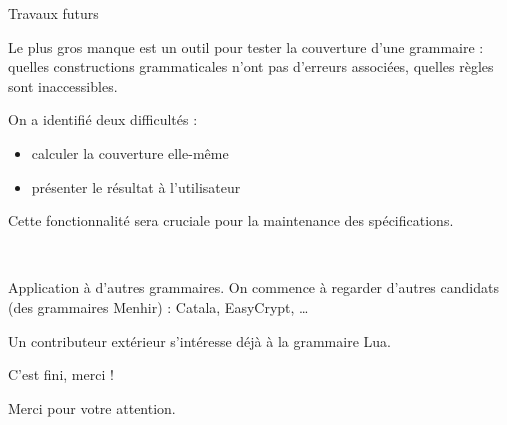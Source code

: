 \documentclass{beamer}          %
\begin{document}
\begin{frame}{Travaux futurs}

Le plus gros manque est un outil pour tester la couverture d'une grammaire : quelles constructions grammaticales n'ont pas d'erreurs associées, quelles règles sont inaccessibles.

On a identifié deux difficultés :
\begin{itemize}
  \item calculer la couverture elle-même
  \item présenter le résultat à l'utilisateur
\end{itemize}

Cette fonctionnalité sera cruciale pour la maintenance des spécifications.

\

\pause
Application à d'autres grammaires. On commence à regarder d'autres candidats (des grammaires Menhir) : Catala, EasyCrypt, \ldots

Un contributeur extérieur s'intéresse déjà à la grammaire Lua.

\end{frame}

\begin{frame}{C'est fini, merci !}

  Merci pour votre attention.

\end{frame}
\end{document}
